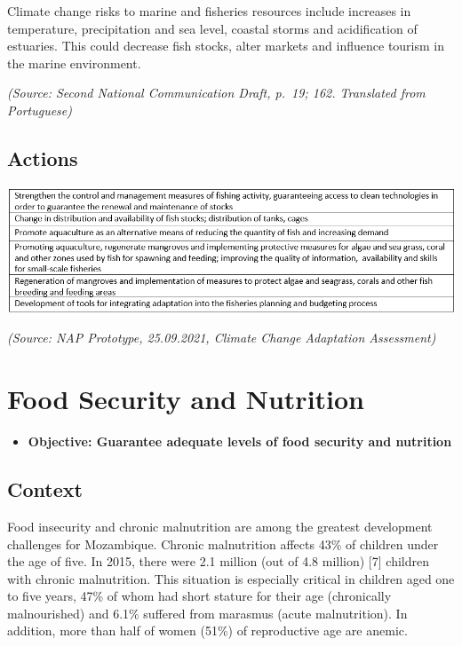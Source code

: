 \documentclass[
]{book}
\providecommand{\tightlist}{%
  \setlength{\itemsep}{0pt}\setlength{\parskip}{0pt}}
\begin{document}
Climate change risks to marine and fisheries resources include increases in temperature, precipitation and sea level, coastal storms and acidification of estuaries. This could decrease fish stocks, alter markets and influence tourism in the marine environment.

\emph{(Source: Second National Communication Draft, p.~19; 162. Translated from Portuguese)}

\hypertarget{actions-1}{%
\subsection{Actions}\label{actions-1}}

\includegraphics{Figure31.png}

\emph{(Source: NAP Prototype, 25.09.2021, Climate Change Adaptation Assessment)}

\hypertarget{food-security-and-nutrition}{%
\section{Food Security and Nutrition}\label{food-security-and-nutrition}}

\begin{itemize}
\tightlist
\item
  \textbf{Objective: Guarantee adequate levels of food security and nutrition}
\end{itemize}

\hypertarget{context-2}{%
\subsection{Context}\label{context-2}}

Food insecurity and chronic malnutrition are among the greatest development challenges for Mozambique. Chronic malnutrition affects 43\% of children under the age of five. In 2015, there were 2.1 million (out of 4.8 million) {[}7{]} children with chronic malnutrition. This situation is especially critical in children aged one to five years, 47\% of whom had short stature for their age (chronically malnourished) and 6.1\% suffered from marasmus (acute malnutrition). In addition, more than half of women (51\%) of reproductive age are anemic.
\end{document}
